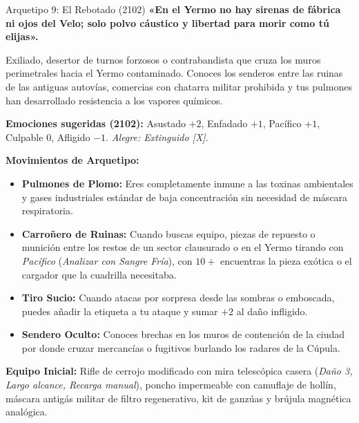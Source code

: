 \begin{FichaArquetipo}{Arquetipo 9: El Rebotado (2102)}
\textbf{«En el Yermo no hay sirenas de fábrica ni ojos del Velo; solo polvo cáustico y libertad para morir como tú elijas».}

Exiliado, desertor de turnos forzosos o contrabandista que cruza los muros perimetrales hacia el Yermo contaminado. Conoces los senderos entre las ruinas de las antiguas autovías, comercias con chatarra militar prohibida y tus pulmones han desarrollado resistencia a los vapores químicos.

\textbf{Emociones sugeridas (2102):} Asustado $+2$, Enfadado $+1$, Pacífico $+1$, Culpable $0$, Afligido $-1$. \textit{Alegre: Extinguido [X]}.

\textbf{Movimientos de Arquetipo:}
\begin{itemize}
    \item \textbf{Pulmones de Plomo:} Eres completamente inmune a las toxinas ambientales y gases industriales estándar de baja concentración sin necesidad de máscara respiratoria.
    \item \textbf{Carroñero de Ruinas:} Cuando buscas equipo, piezas de repuesto o munición entre los restos de un sector clausurado o en el Yermo tirando con \textit{Pacífico} (\textit{Analizar con Sangre Fría}), con $10+$ encuentras la pieza exótica o el cargador que la cuadrilla necesitaba.
    \item \textbf{Tiro Sucio:} Cuando atacas por sorpresa desde las sombras o emboscada, puedes añadir la etiqueta  a tu ataque y sumar $+2$ al daño infligido.
    \item \textbf{Sendero Oculto:} Conoces brechas en los muros de contención de la ciudad por donde cruzar mercancías o fugitivos burlando los radares de la Cúpula.
\end{itemize}

\textbf{Equipo Inicial:} Rifle de cerrojo modificado con mira telescópica casera (\textit{Daño 3, Largo alcance, Recarga manual}), poncho impermeable con camuflaje de hollín, máscara antigás militar de filtro regenerativo, kit de ganzúas y brújula magnética analógica.
\end{FichaArquetipo}

\vspace{1em}

